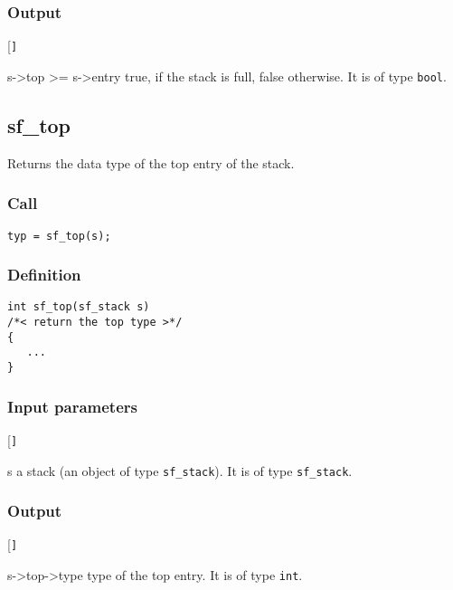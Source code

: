 \subsubsection*{Output}
\begin{desclist}{\tt }{\quad}[\tt ]
   \setlength\itemsep{0pt}
   \item[s->top >= s->entry] true, if the stack is full, false otherwise. It is of type \texttt{bool}.
\end{desclist}




\subsection{{sf\_top}}
Returns the data type of the top entry of the stack.

\subsubsection*{Call}
\begin{verbatim}typ = sf_top(s);\end{verbatim}

\subsubsection*{Definition}
\begin{verbatim}
int sf_top(sf_stack s)
/*< return the top type >*/
{
   ...
}
\end{verbatim}

\subsubsection*{Input parameters}
\begin{desclist}{\tt }{\quad}[\tt ]
   \setlength\itemsep{0pt}
   \item[s] a stack (an object of type \texttt{sf\_stack}). It is of type \texttt{sf\_stack}.
\end{desclist}

\subsubsection*{Output}
\begin{desclist}{\tt }{\quad}[\tt ]
   \setlength\itemsep{0pt}
   \item[s->top->type] type of the top entry. It is of type \texttt{int}.
\end{desclist}




